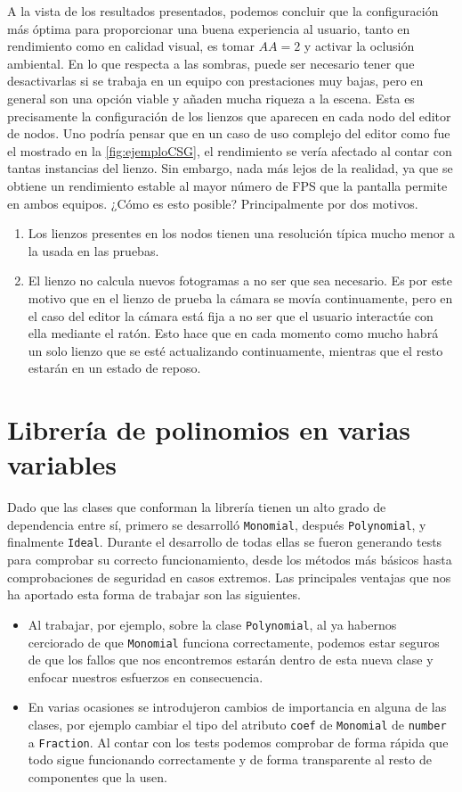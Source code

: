 A la vista de los resultados presentados, podemos concluir que la configuración más óptima para proporcionar una buena experiencia al usuario, tanto en rendimiento como en calidad visual, es tomar $AA=2$ y activar la oclusión ambiental. En lo que respecta a las sombras, puede ser necesario tener que desactivarlas si se trabaja en un equipo con prestaciones muy bajas, pero en general son una opción viable y añaden mucha riqueza a la escena. Esta es precisamente la configuración de los lienzos que aparecen en cada nodo del editor de nodos. Uno podría pensar que en un caso de uso complejo del editor como fue el mostrado en la \autoref{fig:ejemploCSG}, el rendimiento se vería afectado al contar con tantas instancias del lienzo. Sin embargo, nada más lejos de la realidad, ya que se obtiene un rendimiento estable al mayor número de FPS que la pantalla permite en ambos equipos. ¿Cómo es esto posible? Principalmente por dos motivos.
\begin{enumerate}
    \item Los lienzos presentes en los nodos tienen una resolución típica mucho menor a la usada en las pruebas.
    \item El lienzo no calcula nuevos fotogramas a no ser que sea necesario. Es por este motivo que en el lienzo de prueba la cámara se movía continuamente, pero en el caso del editor la cámara está fija a no ser que el usuario interactúe con ella mediante el ratón. Esto hace que en cada momento como mucho habrá un solo lienzo que se esté actualizando continuamente, mientras que el resto estarán en un estado de reposo.
\end{enumerate}

\section{Librería de polinomios en varias variables}
Dado que las clases que conforman la librería tienen un alto grado de dependencia entre sí, primero se desarrolló \texttt{Monomial}, después \texttt{Polynomial}, y finalmente \texttt{Ideal}. Durante el desarrollo de todas ellas se fueron generando tests para comprobar su correcto funcionamiento, desde los métodos más básicos hasta comprobaciones de seguridad en casos extremos. Las principales ventajas que nos ha aportado esta forma de trabajar son las siguientes.
\begin{itemize}
    \item Al trabajar, por ejemplo, sobre la clase \texttt{Polynomial}, al ya habernos cerciorado de que \texttt{Monomial} funciona correctamente, podemos estar seguros de que los fallos que nos encontremos estarán dentro de esta nueva clase y enfocar nuestros esfuerzos en consecuencia.
    \item En varias ocasiones se introdujeron cambios de importancia en alguna de las clases, por ejemplo cambiar el tipo del atributo \texttt{coef} de \texttt{Monomial} de \texttt{number} a \texttt{Fraction}. Al contar con los tests podemos comprobar de forma rápida que todo sigue funcionando correctamente y de forma transparente al resto de componentes que la usen.
\end{itemize}

